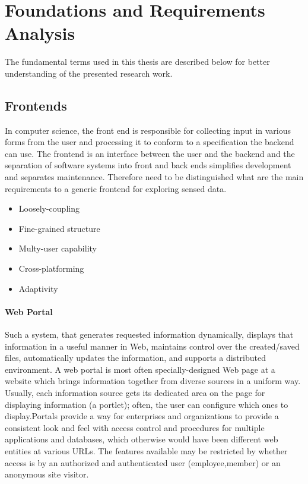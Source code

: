 \chapter{Foundations and Requirements Analysis}

The fundamental terms used in this thesis are described below for better understanding of the presented research work.
\section {Frontends}
In computer science, the front end is responsible for collecting input in various forms from the user and processing it to conform to a specification the backend can use. The frontend is an interface between the user and the backend\cite{wiki:xxx} and the separation of software systems into front and back ends simplifies development and separates maintenance. Therefore need to be distinguished what are the main requirements to a generic frontend for exploring sensed data.
\begin{itemize}
\item Loosely-coupling
\item Fine-grained structure
\item Multy-user capability
\item Cross-platforming
\item Adaptivity
\end{itemize}

\subsubsection {Web Portal}
Such a system, that generates requested information dynamically, displays that
information in a useful manner in Web, maintains control over the created/saved files, automatically updates
the information, and supports a distributed environment\cite{rezayat2000enterprise}.
A web portal is most often specially-designed Web page at a website which brings information together from diverse sources in a uniform way. Usually, each information source gets its dedicated area on the page for displaying information (a portlet); often, the user can configure which ones to display.Portals provide a way for enterprises and organizations to provide a consistent look and feel with access control and procedures for multiple applications and databases, which otherwise would have been different web entities at various URLs. The features available may be restricted by whether access is by an authorized and authenticated user (employee,member) or an anonymous site visitor\cite{wiki:portal}.


